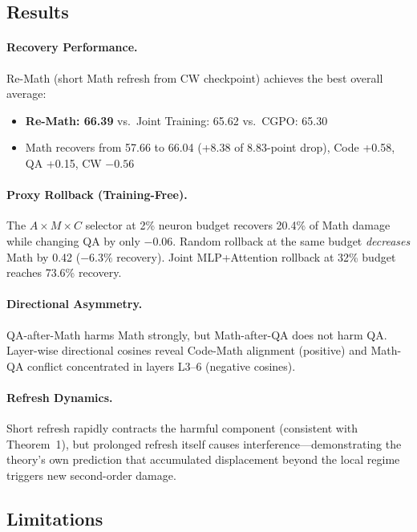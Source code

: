 \documentclass[11pt,a4paper]{article}
\begin{document}
\subsection{Results}

\paragraph{Recovery Performance.} Re-Math (short Math refresh from CW checkpoint) achieves the best overall average:
\begin{itemize}
\item \textbf{Re-Math: 66.39} vs.\ Joint Training: 65.62 vs.\ CGPO: 65.30
\item Math recovers from 57.66 to 66.04 (+8.38 of 8.83-point drop), Code +0.58, QA +0.15, CW $-0.56$
\end{itemize}

\paragraph{Proxy Rollback (Training-Free).} The $A \times M \times C$ selector at 2\% neuron budget recovers 20.4\% of Math damage while changing QA by only $-0.06$. Random rollback at the same budget \emph{decreases} Math by 0.42 ($-6.3\%$ recovery). Joint MLP+Attention rollback at 32\% budget reaches 73.6\% recovery.

\paragraph{Directional Asymmetry.} QA-after-Math harms Math strongly, but Math-after-QA does not harm QA. Layer-wise directional cosines reveal Code-Math alignment (positive) and Math-QA conflict concentrated in layers L3--6 (negative cosines).

\paragraph{Refresh Dynamics.} Short refresh rapidly contracts the harmful component (consistent with Theorem~1), but prolonged refresh itself causes interference---demonstrating the theory's own prediction that accumulated displacement beyond the local regime triggers new second-order damage.

\subsection{Limitations}
\end{document}
